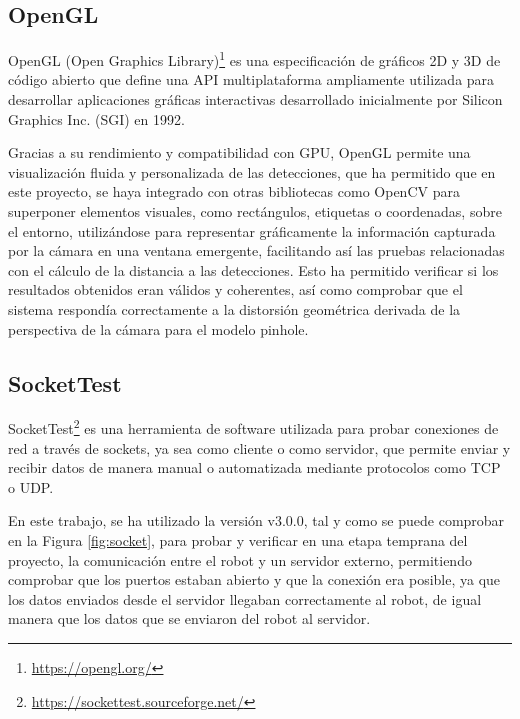 \subsection{OpenGL}
\label{sec:OpenCV}

OpenGL (Open Graphics Library)\footnote{\url{https://opengl.org/}} es una especificación de gráficos 2D y 3D de código abierto que define una API multiplataforma ampliamente utilizada para desarrollar aplicaciones gráficas interactivas desarrollado inicialmente por Silicon Graphics Inc. (SGI) en 1992.

Gracias a su rendimiento y compatibilidad con GPU, OpenGL permite una visualización fluida y personalizada de las detecciones, que ha permitido que en este proyecto, se haya integrado con otras bibliotecas como OpenCV para superponer elementos visuales, como rectángulos, etiquetas o coordenadas, sobre el entorno, utilizándose para representar gráficamente la información capturada por la cámara en una ventana emergente, facilitando así las pruebas relacionadas con el cálculo de la distancia a las detecciones. Esto ha permitido verificar si los resultados obtenidos eran válidos y coherentes, así como comprobar que el sistema respondía correctamente a la distorsión geométrica derivada de la perspectiva de la cámara para el modelo pinhole.

\subsection{SocketTest}
\label{sec:SocketTest}

SocketTest\footnote{\url{https://sockettest.sourceforge.net/}} es una herramienta de software utilizada para probar conexiones de red a través de sockets, ya sea como cliente o como servidor, que permite enviar y recibir datos de manera manual o automatizada mediante protocolos como TCP o UDP.

\pagebreak
En este trabajo, se ha utilizado la versión v3.0.0, tal y como se puede comprobar en la Figura \ref{fig:socket}, para probar y verificar en una etapa temprana del proyecto, la comunicación entre el robot y un servidor externo, permitiendo comprobar que los puertos estaban abierto y que la conexión era posible, ya que los datos enviados desde el servidor llegaban correctamente al robot, de igual manera que los datos que se enviaron del robot al servidor.

